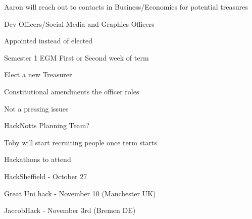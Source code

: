 \documentclass[11pt,hacksoc]{meetingmins}
\begin{document}
\begin{items}
		\subitem
		Aaron will reach out to contacts in Business/Economics for potential treasures
	
	\item
	Dev Officers/Social Media and Graphics Officers
		
		\subitem
		Appointed instead of elected
	
	\item
	Semester 1 EGM
		\subitem
		First or Second week of term
		
		\subitem
		Elect a new Treasurer
		
		\subitem
		Constitutional amendments the officer roles
		
		\subitem
		Not a pressing issues
	
	\item
	HackNotts Planning Team?
	
		\subitem
		Toby will start recruiting people once term starts
		
	\item
	Hackathons to attend
	
		\subitem
		HackSheffield - October 27
		
		\subitem
		Great Uni hack - November 10 (Manchester UK)
		
		\subitem
		JaccobHack - November 3rd (Bremen DE)
	
\end{items}

\vspace{1em}
\end{document}
